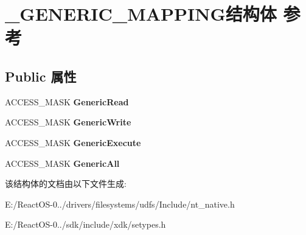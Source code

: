 \hypertarget{struct___g_e_n_e_r_i_c___m_a_p_p_i_n_g}{}\section{\+\_\+\+G\+E\+N\+E\+R\+I\+C\+\_\+\+M\+A\+P\+P\+I\+N\+G结构体 参考}
\label{struct___g_e_n_e_r_i_c___m_a_p_p_i_n_g}
\subsection*{Public 属性}
\begin{DoxyCompactItemize}
\item 
\mbox{\label{struct___g_e_n_e_r_i_c___m_a_p_p_i_n_g_a3990b65766ce76f771a547c17bf7ddb8}} 
A\+C\+C\+E\+S\+S\+\_\+\+M\+A\+SK {\bfseries Generic\+Read}
\item 
\mbox{\label{struct___g_e_n_e_r_i_c___m_a_p_p_i_n_g_a89bc559c8058d3c29d90c82855a0735a}} 
A\+C\+C\+E\+S\+S\+\_\+\+M\+A\+SK {\bfseries Generic\+Write}
\item 
\mbox{\label{struct___g_e_n_e_r_i_c___m_a_p_p_i_n_g_a1aabdf9421f409a092a094ec5c68d70c}} 
A\+C\+C\+E\+S\+S\+\_\+\+M\+A\+SK {\bfseries Generic\+Execute}
\item 
\mbox{\label{struct___g_e_n_e_r_i_c___m_a_p_p_i_n_g_a7111e653ef7fc930944b7e2bccb1e22c}} 
A\+C\+C\+E\+S\+S\+\_\+\+M\+A\+SK {\bfseries Generic\+All}
\end{DoxyCompactItemize}


该结构体的文档由以下文件生成\+:\begin{DoxyCompactItemize}
\item 
E\+:/\+React\+O\+S-\/0../drivers/filesystems/udfs/\+Include/nt\+\_\+native.\+h\item 
E\+:/\+React\+O\+S-\/0../sdk/include/xdk/setypes.\+h\end{DoxyCompactItemize}
